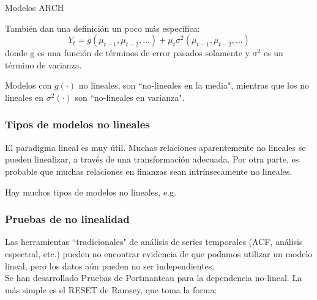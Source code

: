 \documentclass[xcolor=(list of options)]{beamer}
\begin{document}
\begin{section}{Modelos ARCH}
\begin{frame}
Tambi\'en dan una definici\'on un poco m\'as espec\'{i}fica:
\begin{equation}
Y_t = g(\mu_{t-1} ,\mu_{t-2},\dots{}) + \mu_t \sigma^2(\mu_{t-1} ,\mu_{t-2},\dots{})
\end{equation}
donde g es una funci\'on de t\'erminos de error pasados solamente y  $\sigma^2$ es un t\'ermino de varianza.
\vspace{4mm}	

Modelos con $g(\cdot)$ no lineales, son ``no-lineales en la media", mientras que los no lineales en $\sigma^2(\cdot)$ son ``no-lineales en varianza".

\end{frame}

\begin{frame}
\frametitle{Tipos de modelos no lineales}

El paradigma lineal es muy \'util. Muchas relaciones aparentemente no lineales se pueden linealizar, a trav\'es de una transformaci\'on adecuada. Por otra parte, es probable que muchas relaciones en finanzas sean intr\'{i}nsecamente no lineales.\\
\vspace{4mm}	

Hay muchos tipos de modelos no lineales, e.g.\\
\end{frame}

\begin{frame}
\frametitle{Pruebas de no linealidad}

Las herramientas ``tradicionales" de an\'alisis de series temporales (ACF, an\'alisis espectral, etc.) pueden no encontrar evidencia de que podamos utilizar un modelo lineal, pero los datos a\'un pueden no ser independientes.\\
Se han desarrollado Pruebas de Portmanteau para la dependencia no-lineal. La m\'as simple es el RESET de Ramsey, que toma la forma: 	


\end{frame}
\end{section}
\end{document}
